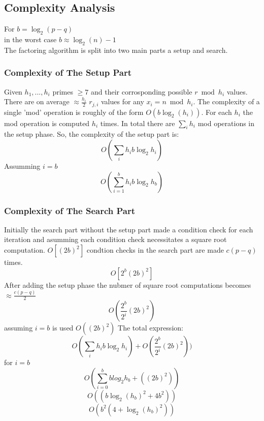 \documentclass{article}
\begin{document}
	\subsection{Complexity Analysis}
		For $b = \log_2(p-q)$\\
		in the worst case $b \approx \log_2(n)-1$\\
		The factoring algorithm is split into two main parts a setup and search.
		\subsubsection{Complexity of The Setup Part}
			Given $h_1,...,h_i$ primes $\geq 7$ and their corrosponding possible $r \bmod h_i$ values. There are on average $\approx \frac{h_i}{2}$  $r_{j,i}$ values for any $ x_i = n \bmod h_i$.
			The complexity of a single 'mod' operation is roughly of the form $O(b\log_2(h_i))$. For each $h_i$ the mod operation is computed $h_i$ times.
			In total there are $\sum_i h_i$ mod operations in the setup phase.
			So, the complexity of the setup part is:\\
			$$O(\sum_i h_i b \log_2 h_i)$$
			Assumming $i=b$\\
			$$O(\sum_{i=1}^b h_i b \log_2 h_b)$$
		\subsubsection{Complexity of The Search Part}
			Initially the search part without the setup part made a condition check for each iteration and asumming each condition check necessitates a square root computation.
			$O[(2b)^2]$
			condtion checks in the search part are made $c(p-q)$ times.
			$$O[2^b (2b)^2]$$
			After adding the setup phase the nubmer of square root computations becomes $\approx \frac{c(p-q)}{2}$
			$$O( \frac{2^b }{2^i } (2b)^2 )$$
			assuming $ i= b$ is used
			$O((2b)^2)$
			The total expression:
			$$O(\sum_i h_i b \log_2 h_i) + O (\frac{2^b }{2^i } (2b)^2 ) )$$
			for $i = b$
			$$O(\sum_{i=0}^b b log_2 h_b +( (2b)^2 ))$$
			$$O((b \log_2(h_b)^2 + 4 b^2))$$
			$$O(b^2 (4+\log_2(h_b)^2))$$
\end{document}
